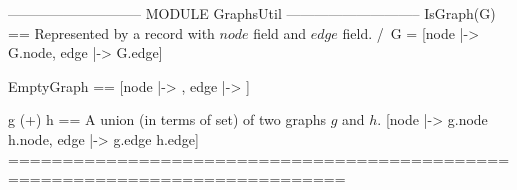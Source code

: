 \documentclass{article}
\begin{document}
\begin{tla}
----------------------------- MODULE GraphsUtil -----------------------------
IsGraph(G) == \* Represented by a record with $node$ field and $edge$ field. 
    /\ G = [node |-> G.node, edge |-> G.edge] 

EmptyGraph == [node |-> {{}}, edge |-> {}]

g (+) h == \* A union (in terms of set) of two graphs $g$ and $h$.
    [node |-> g.node \cup h.node, edge |-> g.edge \cup h.edge]
=============================================================================
\end{tla}
\end{document}
